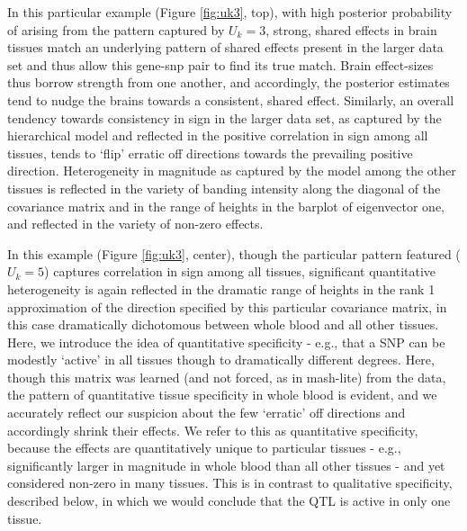 In this particular example (Figure \ref{fig:uk3}, top), with high posterior probability of arising from the pattern captured by $U_{k}=3$, strong, shared effects in brain tissues match an underlying pattern of shared effects present in the larger data set and thus allow this gene-snp pair to find its true match. Brain effect-sizes thus borrow strength from one another, and accordingly, the posterior estimates tend to nudge the brains towards a consistent, shared effect. Similarly, an overall tendency towards consistency in sign in the larger data set, as captured by the hierarchical model and reflected in the positive correlation in sign among all tissues, tends to `flip' erratic off directions towards the prevailing positive direction. Heterogeneity in magnitude as captured by the model among the other tissues is reflected in the variety of banding intensity along the diagonal of the covariance matrix and in the range of heights in the barplot of eigenvector one, and reflected in the variety of non-zero effects. 

In this example (Figure \ref{fig:uk3}, center), though the particular pattern featured ($U_{k}=5$) captures correlation in sign among all tissues, significant quantitative heterogeneity is again reflected in the dramatic range of heights in the rank 1 approximation of the direction specified by this particular covariance matrix, in this case dramatically dichotomous between whole blood and all other tissues. Here, we introduce the idea of quantitative specificity - e.g., that a SNP can be modestly `active' in all tissues though to dramatically different degrees. Here, though this matrix was learned (and not forced, as in mash-lite) from the data, the pattern of quantitative tissue specificity in %
whole blood is evident, and we accurately reflect our suspicion about the few `erratic' off directions and accordingly shrink their effects. %
We refer to this as quantitative specificity, because the effects are quantitatively unique to particular tissues - e.g., significantly larger in magnitude in whole blood than all other tissues - and yet considered non-zero in many tissues. This is in contrast to qualitative specificity, described below, in which we would conclude that the QTL is active in only one tissue. 




